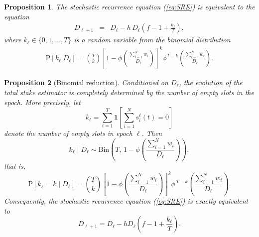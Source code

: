 \documentclass[10pt]{iopart}
\newcommand{\1}{\mathbf{1}}
\newcommand{\Prob}{\mathrm{P}}
\newtheorem{prop}{Proposition}[section]
\begin{document}
\begin{prop}
%
\label{prop:D-distr}
The stochastic recurrence equation (\ref{eq:SRE}) is equivalent to the equation 
%
\begin{eqnarray}
%
D_{\ell+1}&=& D_{\ell}- h\,D_{\ell}\left(f- 1+\frac{k_{\ell}}{T}\right),
%
\end{eqnarray}
%
where $k_{\ell}\in\{0,1,\ldots,T\}$ is a random variable from the binomial distribution
%
\begin{eqnarray}
\Prob[k_{\ell}\vert D_{\ell}]={T\choose k}\left[1-\phi\left(\frac{\sum_{i=1}^Nw_i}{D_{\ell}}\right)\right]^k\phi^{T-k}\left(\frac{\sum_{i=1}^Nw_i}{D_{\ell}}\right).
\end{eqnarray}
% 

\end{prop}


\begin{prop}[Binomial reduction]
\label{prop:D-distr}
Conditioned on $D_\ell$, the evolution of the total stake estimator is completely determined by the number of empty slots in the epoch. More precisely, let
\begin{equation}
k_\ell
=
\sum_{t=1}^T
\1\left[
\sum_{i=1}^N s_i^\ell(t)=0
\right]
\label{eq:k_definition}
\end{equation}
denote the number of empty slots in epoch $\ell$. Then
\begin{equation}
k_\ell\mid D_\ell
\sim
\mathrm{Bin}
\left(
T,\,
1-\phi\!\left(\frac{\sum_{i=1}^N w_i}{D_\ell}\right)
\right),
\label{eq:k_binomial_prop}
\end{equation}
that is,
\begin{equation}
\Prob[k_\ell=k\mid D_\ell]
=
{T\choose k}
\left[
1-\phi\!\left(\frac{\sum_{i=1}^N w_i}{D_\ell}\right)
\right]^k
\phi^{\,T-k}\!\left(\frac{\sum_{i=1}^N w_i}{D_\ell}\right).
\label{eq:k_distribution_prop}
\end{equation}
Consequently, the stochastic recurrence equation (\ref{eq:SRE}) is exactly equivalent to
\begin{equation}
D_{\ell+1}
=
D_\ell
-
hD_\ell
\left(
f-1+\frac{k_\ell}{T}
\right).
\label{eq:SRE_binomial}
\end{equation}
\end{prop}
\end{document}
